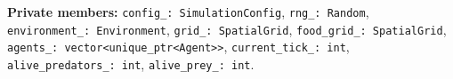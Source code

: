 \textbf{Private members:} \texttt{config\_: SimulationConfig}, \texttt{rng\_: Random},
\texttt{environment\_: Environment}, \texttt{grid\_: SpatialGrid},
\texttt{food\_grid\_: SpatialGrid}, \texttt{agents\_: vector<unique\_ptr<Agent>>},
\texttt{current\_tick\_: int}, \texttt{alive\_predators\_: int}, \texttt{alive\_prey\_: int}.
